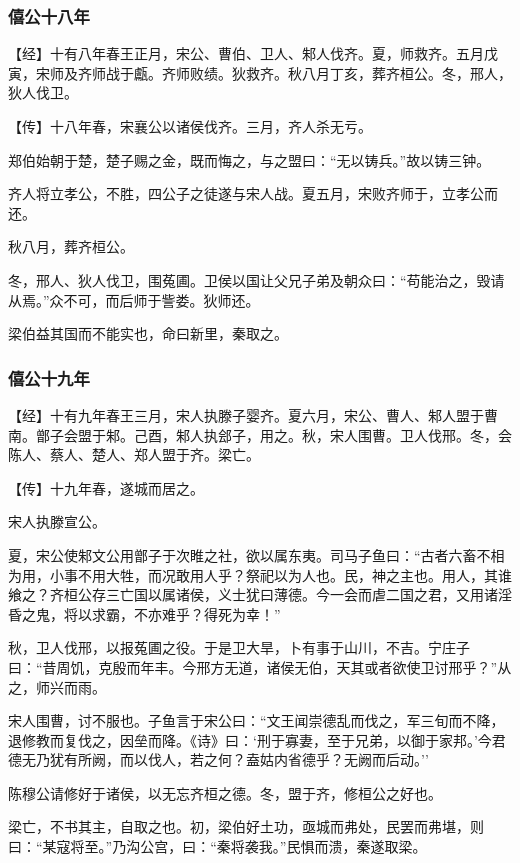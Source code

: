 \documentclass[]{article}
\begin{document}
\hypertarget{header-n838}{%
\subsubsection{僖公十八年}\label{header-n838}}

【经】十有八年春王正月，宋公、曹伯、卫人、邾人伐齐。夏，师救齐。五月戊寅，宋师及齐师战于甗。齐师败绩。狄救齐。秋八月丁亥，葬齐桓公。冬，邢人，狄人伐卫。

【传】十八年春，宋襄公以诸侯伐齐。三月，齐人杀无亏。

郑伯始朝于楚，楚子赐之金，既而悔之，与之盟曰：``无以铸兵。''故以铸三钟。

齐人将立孝公，不胜，四公子之徒遂与宋人战。夏五月，宋败齐师于，立孝公而还。

秋八月，葬齐桓公。

冬，邢人、狄人伐卫，围菟圃。卫侯以国让父兄子弟及朝众曰：``苟能治之，毁请从焉。''众不可，而后师于訾娄。狄师还。

梁伯益其国而不能实也，命曰新里，秦取之。

\hypertarget{header-n848}{%
\subsubsection{僖公十九年}\label{header-n848}}

【经】十有九年春王三月，宋人执滕子婴齐。夏六月，宋公、曹人、邾人盟于曹南。鄫子会盟于邾。己酉，邾人执郐子，用之。秋，宋人围曹。卫人伐邢。冬，会陈人、蔡人、楚人、郑人盟于齐。梁亡。

【传】十九年春，遂城而居之。

宋人执滕宣公。

夏，宋公使邾文公用鄫子于次睢之社，欲以属东夷。司马子鱼曰：``古者六畜不相为用，小事不用大牲，而况敢用人乎？祭祀以为人也。民，神之主也。用人，其谁飨之？齐桓公存三亡国以属诸侯，义士犹曰薄德。今一会而虐二国之君，又用诸淫昏之鬼，将以求霸，不亦难乎？得死为幸！''

秋，卫人伐邢，以报菟圃之役。于是卫大旱，卜有事于山川，不吉。宁庄子曰：``昔周饥，克殷而年丰。今邢方无道，诸侯无伯，天其或者欲使卫讨邢乎？''从之，师兴而雨。

宋人围曹，讨不服也。子鱼言于宋公曰：``文王闻崇德乱而伐之，军三旬而不降，退修教而复伐之，因垒而降。《诗》曰：`刑于寡妻，至于兄弟，以御于家邦。'今君德无乃犹有所阙，而以伐人，若之何？盍姑内省德乎？无阙而后动。''

陈穆公请修好于诸侯，以无忘齐桓之德。冬，盟于齐，修桓公之好也。

梁亡，不书其主，自取之也。初，梁伯好土功，亟城而弗处，民罢而弗堪，则曰：``某寇将至。''乃沟公宫，曰：``秦将袭我。''民惧而溃，秦遂取梁。
\end{document}
